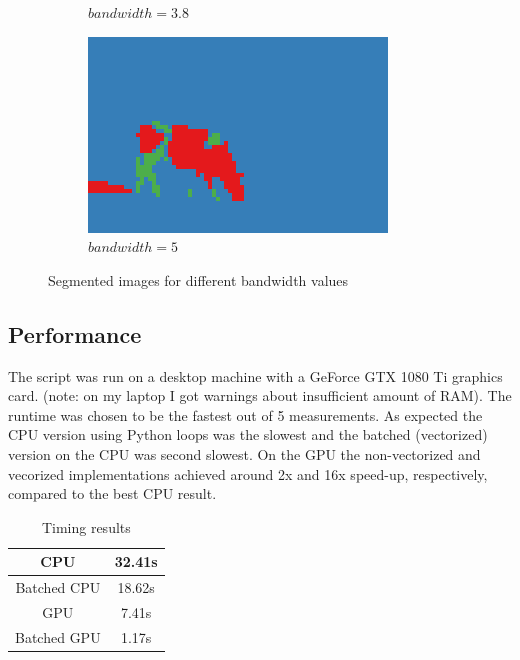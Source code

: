 \documentclass[10pt,a4paper,twoside]{article}
\newcommand{\sweepsize}{0.24}
\begin{document}
\begin{figure}[h]
\begin{subfigure}{\sweepsize\textwidth}
    \caption{$bandwidth=3.8$}
    \end{subfigure}
    \begin{subfigure}{\sweepsize\textwidth}
    \includegraphics[width=0.9\linewidth]{result_5.png} 
    \caption{$bandwidth=5$}
    \end{subfigure}
    \caption{Segmented images for different bandwidth values}

\end{figure}

\subsection*{Performance}

The script was run on a desktop machine with a GeForce GTX 1080 Ti graphics
card. (note: on my laptop I got warnings about insufficient amount of RAM). The
runtime was chosen to be the fastest out of 5 measurements. As expected the CPU
version using Python loops was the slowest and the batched (vectorized) version
on the CPU was second slowest. On the GPU the non-vectorized and vecorized
implementations achieved around 2x and 16x speed-up, respectively, compared to
the best CPU result.

\begin{table}[h!]
\begin{center}
    \begin{tabular}{|c | c|} 
     \hline
     CPU & 32.41s \\
     \hline
     Batched CPU & 18.62s\\ 
     \hline
     GPU & 7.41s\\
     \hline
     Batched GPU & 1.17s\\
     \hline
    \end{tabular}
    \caption{Timing results}
\end{center}
\end{table}    


\end{document}
